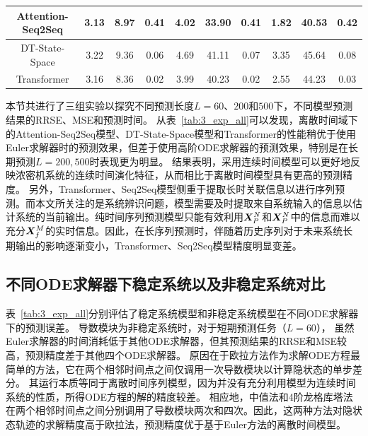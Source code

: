 \begin{table}[htpb]
{\begin{tabular}{c|c|ccccccccc}
\multicolumn{2}{c|}{Attention-Seq2Seq\cite{Member2019}}                                                                             & 3.13                 & 8.97                 & \multicolumn{1}{c|}{0.41}             & 4.02                 & 33.90                & \multicolumn{1}{c|}{0.41}              & 1.82                 & 40.53                & 0.42                 \\ \hline
\multicolumn{2}{c|}{DT-State-Space\cite{Rangapuram2018}}                                                                               & 3.22                 & 9.36                 & \multicolumn{1}{c|}{0.06}             & 4.69                 & 41.11                & \multicolumn{1}{c|}{0.07}              & 3.35                 & 45.64                & 0.08                 \\
\multicolumn{2}{c|}{Transformer\cite{Wu2020}}                                                                               & 3.16                 & 8.36                 & \multicolumn{1}{c|}{0.02}             & 3.99                 & 40.23                & \multicolumn{1}{c|}{0.02}              & 2.55                 & 44.23                & 0.03                 \\
\bottomrule
\end{tabular}}
\end{table}

本节共进行了三组实验以探究不同预测长度$L=60$、$200$和$500$下，不同模型预测结果的RRSE、MSE和预测时间。
从表~\ref{tab:3_exp_all}可以发现，离散时间域下的Attention-Seq2Seq模型、DT-State-Space模型和Transformer的性能稍优于使用Euler求解器时的预测效果，但差于使用高阶ODE求解器的预测效果，特别是在长期预测$L=200, 500$时表现更为明显。
结果表明，采用连续时间模型可以更好地反映浓密机系统的连续时间演化特征，从而相比于离散时间模型具有更高的预测精度。
另外，Transformer、Seq2Seq模型侧重于提取长时关联信息以进行序列预测。而本文所关注的是系统辨识问题，模型需要及时提取来自系统输入的信息以估计系统的当前输出。纯时间序列预测模型只能有效利用$\boldsymbol X_P^N$和$\boldsymbol X_P^N$中的信息而难以充分$\boldsymbol X_f^M$的实时信息。因此，在长序列预测时，伴随着历史序列对于未来系统长期输出的影响逐渐变小，Transformer、Seq2Seq模型精度明显变差。

\subsection{不同ODE求解器下稳定系统以及非稳定系统对比}
表~\ref{tab:3_exp_all}分别评估了稳定系统模型和非稳定系统模型在不同ODE求解器下的预测误差。
导数模块为非稳定系统时，对于短期预测任务（$L = 60$），
虽然Euler求解器的时间消耗低于其他ODE求解器，但其预测结果的RRSE和MSE较高，预测精度差于其他四个ODE求解器。
原因在于欧拉方法作为求解ODE方程最简单的方法，它在两个相邻时间点之间仅调用一次导数模块以计算隐状态的单步差分。
其运行本质等同于离散时间序列模型，因为并没有充分利用模型为连续时间系统的性质，所得ODE方程的解的精度较差。
相应地，中值法和4阶龙格库塔法在两个相邻时间点之间分别调用了导数模块两次和四次。因此，这两种方法对隐状态轨迹的求解精度高于欧拉法，预测精度优于基于Euler方法的离散时间模型。


